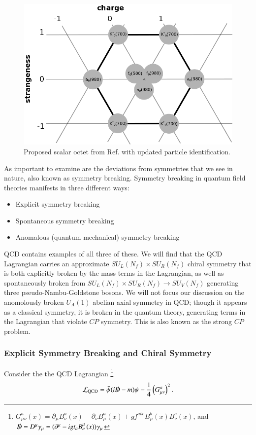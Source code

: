 \documentclass[aps,prd,onecolumn,showpacs,amsmath,amssymb,nofootinbib]{revtex4} \pdfoutput=1
\begin{document}
\begin{figure}
    \centering
    \includegraphics[scale=0.5]{scalar-octet.png}
    \caption{Proposed scalar octet from Ref. \cite{Jaffe1977} with updated particle identification.}
    \label{fig:scalar-octet}
\end{figure}
As important to examine are the deviations from symmetries that we see in nature, also known as symmetry breaking. Symmetry breaking in quantum field theories manifests in three different ways:
\begin{itemize}
    \item Explicit symmetry breaking
    \item Spontaneous symmetry breaking
    \item Anomalous (quantum mechanical) symmetry breaking
\end{itemize}
QCD contains examples of all three of these. We will find that the QCD Lagrangian carries an approximate $S\!U_{L}(N_f)\times S\!U_{R}(N_f)$ chiral symmetry that is both explicitly broken by the mass terms in the Lagrangian, as well as spontaneously broken from $S\!U_{L}(N_f)\times S\!U_{R}(N_f) \rightarrow S\!U_{V}(N_f)$ generating three pseudo-Nambu-Goldstone bosons. We will not focus our discussion on the anomolously broken $U_{A}(1)$ abelian axial symmetry in QCD; though it appears as a classical symmetry, it is broken in the quantum theory, generating terms in the Lagrangian that violate $CP$ symmetry. This is also known as the strong $CP$ problem.

\subsubsection{Explicit Symmetry Breaking and Chiral Symmetry}
Consider the the QCD Lagrangian
\footnote{$G^{a}_{\mu \nu}\left(x\right) = \partial_{\mu}B_{\nu}^{a}\left(x\right)-\partial_{\nu}B_{\mu}^{a}\left(x\right)+g f^{abc} B_{\mu}^{b}\left(x\right) B_{\nu}^{c}\left(x\right)$, and $\slashed{D} = D^{\mu}\gamma_{\mu} = (\partial^{\mu}-i g t_{a} B^{\mu}_{a}\left(x\right)) \gamma_{\mu}$}
\begin{equation}
\mathcal{L}_\mathrm{QCD}=  \bar{\psi}(i\slashed{D}-m)\psi-\frac{1}{4}\left(G^{a}_{\mu \nu}\right)^2.
\label{qcdlagrangian}
\end{equation}
\end{document}
